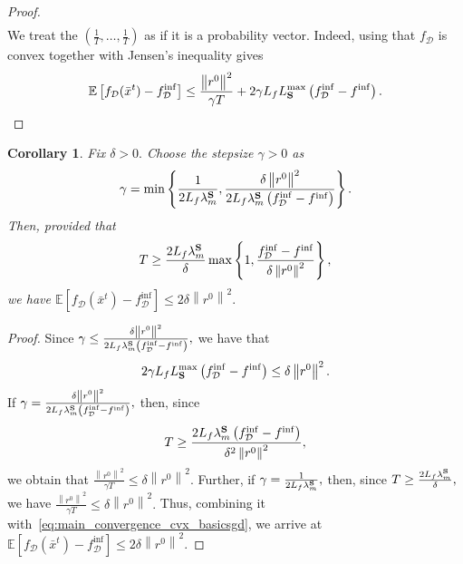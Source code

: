 \documentclass{article}
\newcommand{\bb}{\mathbb}
\newcommand{\norm}[1]{\left\| #1 \right\|}
\newcommand{\Exp}[1]{{\bb E}\left[#1\right]}
\theoremstyle{plain}
\newtheorem{corollary}{Corollary}
\newcommand{\tf}{f_{\mathcal{D}}}
\newcommand{\mS}{{\bf S}}
\theoremstyle{plain}
\theoremstyle{definition}
\theoremstyle{remark}
\begin{document}
\begin{proof}
\begin{equation*}
\begin{split}
	\end{split}
\end{equation*}
We treat the $\left(\frac{1}{T},\ldots,\frac{1}{T}\right)$ as if it is a probability vector.
Indeed, using that $\tf$ is convex together with Jensen's inequality gives
\begin{equation*}
	\begin{split}
		\Exp{\tf(\bar{x}^t) - \tf^{\inf}} &\leq \frac{\norm{r^0}^2}{\gamma T} + 2\gamma L_fL_{\mS}^{\max}\left(\tf^{\inf} - f^{\inf}\right).\\
	\end{split}
\end{equation*}
\end{proof}
\begin{corollary}
	Fix $\delta>0.$ Choose the stepsize $\gamma>0$ as
	\begin{equation*}
		\gamma = \min\left\lbrace \frac{1}{2L_f\lambda_m^{\mS}}, \frac{\delta\norm{r^0}^2}{2L_f\lambda_m^{\mS}\left(\tf^{\inf} - f^{\inf}\right)} \right\rbrace.
	\end{equation*}
	Then, provided that
	\begin{equation*}
		T\geq \frac{2L_f\lambda_m^{\mS}}{\delta}\max\left\lbrace 1, \frac{\tf^{\inf} - f^{\inf}}{\delta\norm{r^0}^2}\right\rbrace,
	\end{equation*}
	we have $\Exp{\tf(\bar{x}^t) - \tf^{\inf}}\leq 2\delta\norm{r^0}^2.$
\end{corollary}
\begin{proof}
	Since $\gamma\leq\frac{\delta\norm{r^0}^2}{2L_f\lambda_m^{\mS}\left(\tf^{\inf} - f^{\inf}\right)},$ we have that
	\begin{equation*}
		2\gamma L_fL_{\mS}^{\max}\left(\tf^{\inf} - f^{\inf}\right)\leq\delta\norm{r^0}^2.
	\end{equation*}
	If $\gamma = \frac{\delta\norm{r^0}^2}{2L_f\lambda_m^{\mS}\left(\tf^{\inf} - f^{\inf}\right)},$ then, since
	\begin{equation*}
		T \geq \frac{2L_f\lambda_m^{\mS}\left(\tf^{\inf} - f^{\inf}\right)}{\delta^2\norm{r^0}^2},
	\end{equation*}
	we obtain that $\frac{\norm{r^0}^2}{\gamma T}\leq \delta\norm{r^0}^2.$ Further, if $\gamma = \frac{1}{2L_f\lambda_m^{\mS}},$ then, since $T\geq \frac{2L_f\lambda_m^{\mS}}{\delta},$ we have $\frac{\norm{r^0}^2}{\gamma T}\leq\delta\norm{r^0}^2.$ Thus, combining it with~\eqref{eq:main_convergence_cvx_basicsgd}, we arrive at $\Exp{\tf(\bar{x}^t) - \tf^{\inf}}\leq 2\delta\left\|r^0\right\|^2.$
\end{proof}
\clearpage
\end{document}
